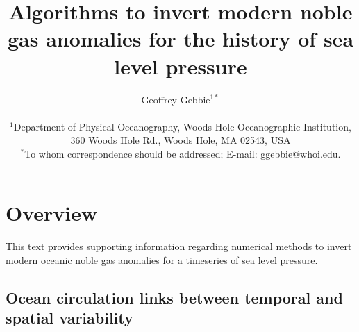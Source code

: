 \documentclass[12pt]{article}
\title{Algorithms to invert modern noble gas anomalies for the history of sea level pressure}
\author
{Geoffrey Gebbie$^{1\ast}$ \\
\\
\normalsize{$^{1}$Department of Physical Oceanography, Woods Hole Oceanographic Institution,}\\
\normalsize{360 Woods Hole Rd., Woods Hole, MA 02543, USA}\\ 
\normalsize{$^\ast$To whom correspondence should be addressed; E-mail:  ggebbie@whoi.edu.}
}
\date{}
\newenvironment{sciabstract}{%
\begin{quote} \bf}
{\end{quote}}
\begin{document}
 


\baselineskip24pt


\maketitle 


\begin{sciabstract}
\end{sciabstract}


\section{Overview} 

This text provides supporting information regarding numerical methods
to invert modern oceanic noble gas anomalies for a timeseries of sea level pressure.

\subsection{Ocean circulation links between temporal and spatial variability}
\label{sec:hist-surf-vari}
\end{document}

